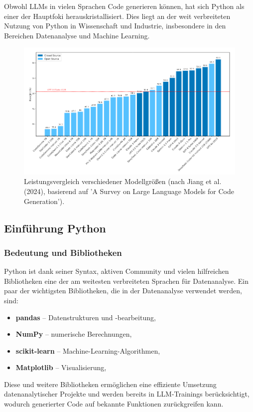 \documentclass[11pt,a4paper]{article}
\begin{document}
Obwohl LLMs in vielen Sprachen Code generieren können, hat sich Python als einer der Hauptfoki herauskristallisiert. Dies liegt an der weit verbreiteten Nutzung von Python in Wissenschaft und Industrie, insbesondere in den Bereichen Datenanalyse und Machine Learning.
\begin{figure}[H]
    \centering
    \includegraphics[width=1\textwidth]{./bilder/performance_comparison.png}
    \caption{Leistungsvergleich verschiedener Modellgrößen (nach Jiang et al. (2024), basierend auf 'A Survey on Large Language Models for Code Generation'\cite{jiang2024surveylargelanguagemodels}).}
    \label{fig:performance_comparison}
\end{figure}

\subsection{Einführung Python}
\label{sec:Python}
\subsubsection{Bedeutung und Bibliotheken}
Python ist dank seiner Syntax, aktiven Community und vielen hilfreichen Bibliotheken eine der am weitesten verbreiteten Sprachen für Datenanalyse\cite{raschka2020machinelearningpythonmain}. Ein paar der wichtigsten Bibliotheken, die in der Datenanalyse verwendet werden, sind:
\begin{itemize}
    \item \textbf{pandas} -- Datenstrukturen und -bearbeitung,
    \item \textbf{NumPy} -- numerische Berechnungen,
    \item \textbf{scikit-learn} -- Machine-Learning-Algorithmen,
    \item \textbf{Matplotlib} -- Visualisierung,
\end{itemize} 
Diese und weitere Bibliotheken ermöglichen eine effiziente Umsetzung datenanalytischer Projekte und werden bereits in LLM-Trainings berücksichtigt, wodurch generierter Code auf bekannte Funktionen zurückgreifen kann\cite{evalplus,chen2021evaluatinglargelanguagemodels}.
\end{document}
